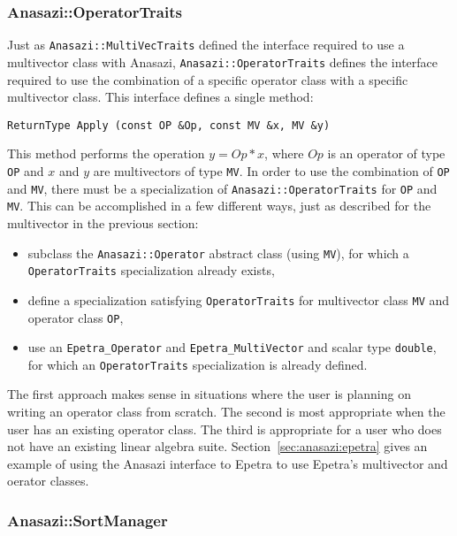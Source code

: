 \subsubsection{Anasazi::OperatorTraits}
\label{sec:anasazi:opt}

Just as \verb!Anasazi::MultiVecTraits! defined the interface required to use a
multivector class with Anasazi, \verb!Anasazi::OperatorTraits! defines the
interface required to use the combination of a specific operator class with a
specific multivector class. This interface defines a single method:
\begin{verbatim}
ReturnType Apply (const OP &Op, const MV &x, MV &y)
\end{verbatim}
This method performs the operation $y = Op*x$, where $Op$ is an operator of type
\verb!OP! and $x$ and $y$ are multivectors of type \verb!MV!. In order to use the
combination of \verb!OP! and \verb!MV!, there must be a specialization of
\verb!Anasazi::OperatorTraits! for \verb!OP! and \verb!MV!. This can be
accomplished in a few different ways, just as described for the multivector in
the previous section:
\begin{itemize}
\item subclass the \verb!Anasazi::Operator! abstract class (using
\verb!MV!), for which a \verb!OperatorTraits! specialization already exists,
\item define a specialization satisfying \verb!OperatorTraits! for multivector
class \verb!MV! and operator class \verb!OP!,
\item use an \verb!Epetra_Operator! and \verb!Epetra_MultiVector! and scalar
type \verb!double!, for which an \verb!OperatorTraits! specialization is already
defined.
\end{itemize}

The first approach makes sense in situations where the user is planning on writing an
operator class from scratch. The second is most appropriate when the user has an
existing operator class. The third is appropriate for a user who does not have
an existing linear algebra suite. Section~\ref{sec:anasazi:epetra} gives an
example of using the Anasazi interface to Epetra to use Epetra's multivector and
oerator classes.

\subsubsection{Anasazi::SortManager}
\label{sec:anasazi:sm}

